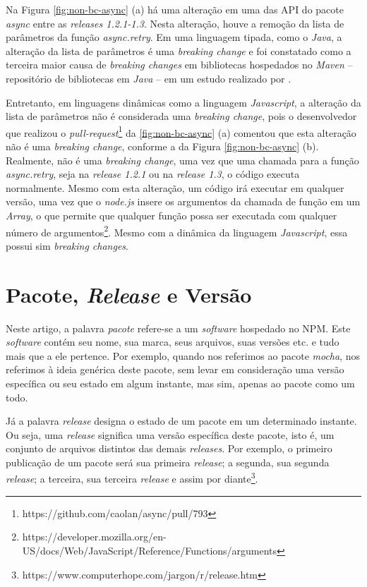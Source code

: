 Na Figura \ref{fig:non-bc-async} (a) há uma alteração em uma das \gls{API} do pacote \textit{async} entre as \textit{releases 1.2.1-1.3}. Nesta alteração, houve a remoção da lista de parâmetros da função \textit{async.retry}. Em uma linguagem tipada, como o \textit{Java}, a alteração da lista de parâmetros é uma \textit{breaking change} e foi constatado como a terceira maior causa de \textit{breaking changes} em bibliotecas hospedados no \textit{Maven} -- repositório de bibliotecas em \textit{Java} -- em um estudo realizado por .

Entretanto, em linguagens dinâmicas como a linguagem \textit{Javascript}, a alteração da lista de parâmetros não é considerada uma \textit{breaking change}, pois o desenvolvedor que realizou o \textit{pull-request}\footnote{https://github.com/caolan/async/pull/793} da \ref{fig:non-bc-async} (a) comentou que esta alteração não é uma \textit{breaking change}, conforme a da Figura \ref{fig:non-bc-async} (b). Realmente, não é uma \textit{breaking change}, uma vez que uma chamada para a função \textit{async.retry}, seja na \textit{release 1.2.1} ou na \textit{release 1.3}, o código executa normalmente. Mesmo com esta alteração, um código irá executar em qualquer versão, uma vez que o \textit{node.js} insere os argumentos da chamada de função em um \textit{Array}, o que permite que qualquer função possa ser executada com qualquer número de argumentos\footnote{https://developer.mozilla.org/en-US/docs/Web/JavaScript/Reference/Functions/arguments}. Mesmo com a dinâmica da linguagem \textit{Javascript}, essa possui sim \textit{breaking changes}.

\section{Pacote, \textit{Release} e Versão}
\label{ref-teo:release}
Neste artigo, a palavra \textit{pacote} refere-se a um \textit{software} hospedado no \gls{NPM}. Este \textit{software} contém seu nome, sua marca, seus arquivos, suas versões etc. e tudo mais que a ele pertence. Por exemplo, quando nos referimos ao pacote \textit{mocha}, nos referimos à ideia genérica deste pacote, sem levar em consideração uma versão específica ou seu estado em algum instante, mas sim, apenas ao pacote como um todo.

Já a palavra \textit{release} designa o estado de um pacote em um determinado instante. Ou seja, uma \textit{release} significa uma versão específica deste pacote, isto é, um conjunto de arquivos distintos das demais \textit{releases}. Por exemplo, o primeiro publicação de um pacote será sua primeira \textit{release}; a segunda, sua segunda \textit{release}; a terceira, sua terceira \textit{release} e assim por diante\footnote{https://www.computerhope.com/jargon/r/release.htm}.

